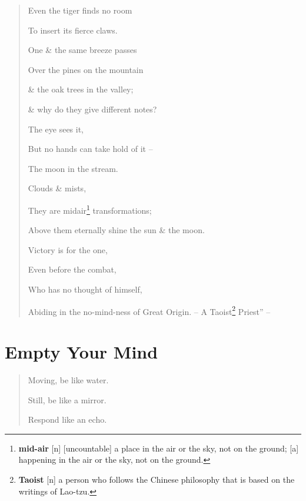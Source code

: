 \documentclass[oneside]{book}
\numberwithin{equation}{section}
\begin{document}
\begin{quotation}
	
	
	Even the tiger finds no room
	
	To insert its fierce claws.
	
	One \& the same breeze passes
	
	Over the pines on the mountain
	
	\& the oak trees in the valley;
	
	\& why do they give different notes?
	
	
	
	
	
	The eye sees it,
	
	But no hands can take hold of it --
	
	
	The moon in the stream.
	
	Clouds \& mists,
	
	They are midair\footnote{\textbf{mid-air} [n] [uncountable] a place in the air or the sky, not on the ground; [a] happening in the air or the sky, not on the ground.} transformations;
	
	Above them eternally shine the sun \& the moon.
	
	Victory is for the one,
	
	Even before the combat,
	
	Who has no thought of himself,
	
	Abiding in the no-mind-ness of Great Origin. -- A Taoist\footnote{\textbf{Taoist} [n] a person who follows the Chinese philosophy that is based on the writings of Lao-tzu.} Priest'' -- \cite[p. 11]{Lee2011}
\end{quotation}


\section{Empty Your Mind}
\begin{quotation}
	Moving, be like water.
	
	Still, be like a mirror.
	
	Respond like an echo.
\end{quotation}
\end{document}
